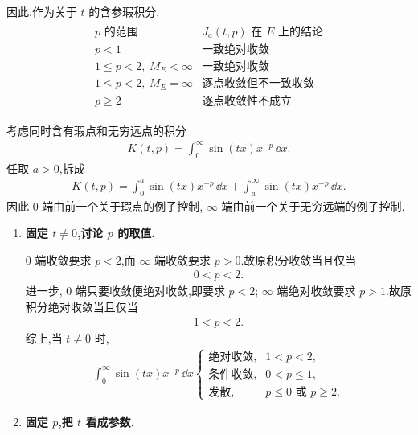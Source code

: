 \begin{exbox}
\begin{enumerate}
		因此,作为关于 $t$ 的含参瑕积分,
		\begin{gather*}
		\begin{array}{c|c}
			p\text{ 的范围}&J_a(t,p)\text{ 在 }E\text{ 上的结论}\\ \hline
			p<1&\text{一致绝对收敛}\\[3pt]
			1\leq p<2,\ M_E<\infty&\text{一致绝对收敛}\\[3pt]
			1\leq p<2,\ M_E=\infty&\text{逐点收敛但不一致收敛}\\[3pt]
			p\geq2&\text{逐点收敛性不成立}
		\end{array}
		\end{gather*}
	\end{enumerate}
\end{exbox}

\begin{exbox}
	考虑同时含有瑕点和无穷远点的积分
	\begin{align*}
		K(t,p)=\int_0^\infty \sin(tx)x^{-p}\,\dd x.
	\end{align*}
	任取 $a>0$,拆成
	\begin{align*}
		K(t,p)
		=
		\int_0^a \sin(tx)x^{-p}\,\dd x
		+
		\int_a^\infty \sin(tx)x^{-p}\,\dd x.
	\end{align*}
	因此 $0$ 端由前一个关于瑕点的例子控制, $\infty$ 端由前一个关于无穷远端的例子控制.

	\begin{enumerate}
		\item \textbf{固定 $t\neq0$,讨论 $p$ 的取值.}

		$0$ 端收敛要求 $p<2$,而 $\infty$ 端收敛要求 $p>0$.故原积分收敛当且仅当
		\begin{align*}
			0<p<2.
		\end{align*}
		进一步, $0$ 端只要收敛便绝对收敛,即要求 $p<2$; $\infty$ 端绝对收敛要求 $p>1$.故原积分绝对收敛当且仅当
		\begin{align*}
			1<p<2.
		\end{align*}
		综上,当 $t\neq0$ 时,
		\begin{gather*}
			\int_0^\infty \sin(tx)x^{-p}\,\dd x
			\begin{cases}
				\text{绝对收敛},&1<p<2,\\[3pt]
				\text{条件收敛},&0<p\leq1,\\[3pt]
				\text{发散},&p\leq0\text{ 或 }p\geq2.
			\end{cases}
		\end{gather*}

		\item \textbf{固定 $p$,把 $t$ 看成参数.}


\end{enumerate}
\end{exbox}
